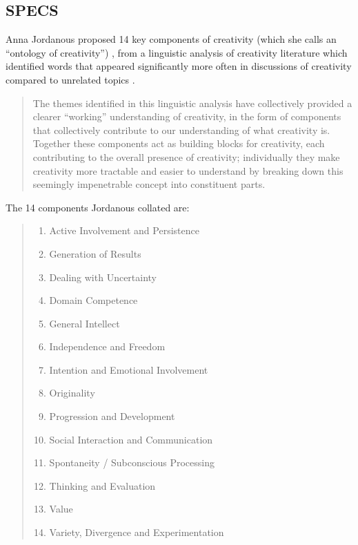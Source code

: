 \subsection{SPECS}
\label{s:specs}

Anna Jordanous proposed 14 key components of creativity (which she calls an ``ontology of creativity'') \autocite*{Jordanous2012}, from a linguistic analysis of creativity literature which identified words that appeared significantly more often in discussions of creativity compared to unrelated topics \autocite*{Jordanous2012}.

\begin{quotation}
  The themes identified in this linguistic analysis have collectively provided a clearer ``working'' understanding of creativity, in the form of components that collectively contribute to our understanding of what creativity is. Together these components act as building blocks for creativity, each contributing to the overall presence of creativity; individually they make creativity more tractable and easier to understand by breaking down this seemingly impenetrable concept into constituent parts. 
\end{quotation}

The 14 components Jordanous collated are: \autocite*{Jordanous2012}
\begin{quotation}
  \begin{enumerate}
    \item Active Involvement and Persistence
    \item Generation of Results
    \item Dealing with Uncertainty
    \item Domain Competence
    \item General Intellect
    \item Independence and Freedom
    \item Intention and Emotional Involvement
    \item Originality
    \item Progression and Development
    \item Social Interaction and Communication
    \item Spontaneity / Subconscious Processing
    \item Thinking and Evaluation
    \item Value
    \item Variety, Divergence and Experimentation
  \end{enumerate}
\end{quotation}

